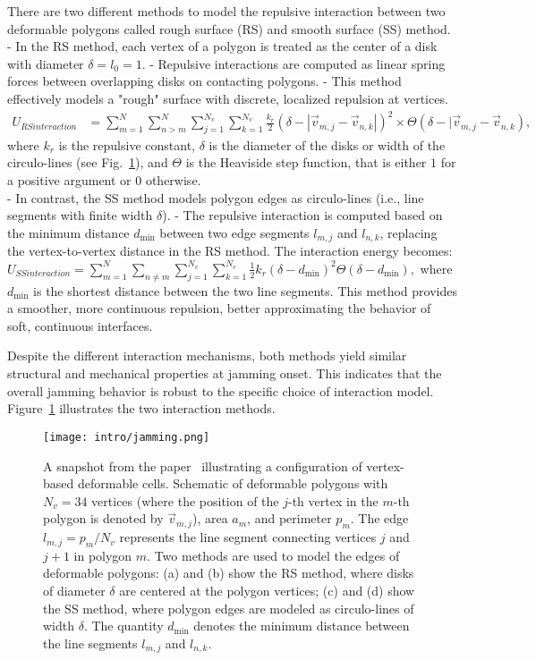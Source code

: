 There are two different methods to model the repulsive interaction between two deformable polygons called rough surface (RS) and smooth surface (SS) method.
- In the RS method, each vertex of a polygon is treated as the center of a disk with diameter $\delta = l_0 = 1$. 
- Repulsive interactions are computed as linear spring forces between overlapping disks on contacting polygons. 
- This method effectively models a "rough" surface with discrete, localized repulsion at vertices.
\begin{align*}
	U_{RS interaction} &=  \sum\limits_{m=1}^{N} \sum\limits_{n>m}^{N} \sum\limits_{j=1}^{N_v} \sum\limits_{k=1}^{N_v} \frac{k_r}{2} (\delta - |\vec{v}_{m,j} - \vec{v}_{n,k} |)^2 \times \Theta(\delta - |\vec{v}_{m,j} - \vec{v}_{n,k}) ,
\end{align*}
where $k_r$ is the repulsive constant, $\delta$ is the diameter of the disks or width of the circulo-lines (see Fig.~\ref{fig:vertex}), and $\Theta$ is the Heaviside step function, that is either $1$ for a positive argument or $0$ otherwise. \\

- In contrast, the SS method models polygon edges as circulo-lines (i.e., line segments with finite width $\delta$). 
- The repulsive interaction is computed based on the minimum distance $d_{\min}$ between two edge segments $l_{m,j}$ and $l_{n,k}$, replacing the vertex-to-vertex distance in the RS method. 
The interaction energy becomes:
$
U_{SS interaction} = \sum_{m=1}^N \sum_{n \neq m} \sum_{j=1}^{N_v} \sum_{k=1}^{N_v} \frac{1}{2} k_r \left( \delta - d_{\min} \right)^2 \Theta\left( \delta - d_{\min} \right),
$
where $d_{\min}$ is the shortest distance between the two line segments. 
This method provides a smoother, more continuous repulsion, better approximating the behavior of soft, continuous interfaces.

Despite the different interaction mechanisms, both methods yield similar structural and mechanical properties at jamming onset. 
This indicates that the overall jamming behavior is robust to the specific choice of interaction model.
Figure~\ref{fig:vertex} illustrates the two interaction methods.

\begin{figure}[h!]
	\centering
	\texttt{[image: intro/jamming.png]}
	\caption{A snapshot from the paper~\cite{Boromand2018} illustrating a configuration of vertex-based deformable cells. 
	Schematic of deformable polygons with $N_v = 34$ vertices (where the position of the $j$-th vertex in the $m$-th polygon is denoted by $\vec{v}_{m,j}$), area $a_m$, and perimeter $p_m$. 
	The edge $l_{m,j} = p_m / N_v$ represents the line segment connecting vertices $j$ and $j+1$ in polygon $m$. 
	Two methods are used to model the edges of deformable polygons: (a) and (b) show the RS method, where disks of diameter $\delta$ are centered at the polygon vertices; (c) and (d) show the SS method, where polygon edges are modeled as circulo-lines of width $\delta$. 
	The quantity $d_{\text{min}}$ denotes the minimum distance between the line segments $l_{m,j}$ and $l_{n,k}$.
	}
	\label{fig:vertex}
\end{figure}

